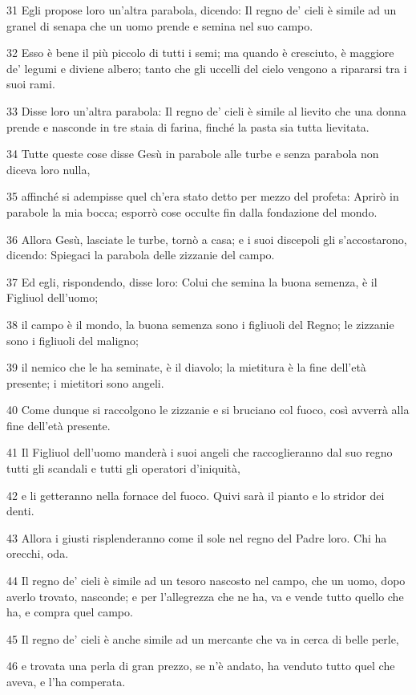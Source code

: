 \par 31 Egli propose loro un'altra parabola, dicendo: Il regno de' cieli è simile ad un granel di senapa che un uomo prende e semina nel suo campo.
\par 32 Esso è bene il più piccolo di tutti i semi; ma quando è cresciuto, è maggiore de' legumi e diviene albero; tanto che gli uccelli del cielo vengono a ripararsi tra i suoi rami.
\par 33 Disse loro un'altra parabola: Il regno de' cieli è simile al lievito che una donna prende e nasconde in tre staia di farina, finché la pasta sia tutta lievitata.
\par 34 Tutte queste cose disse Gesù in parabole alle turbe e senza parabola non diceva loro nulla,
\par 35 affinché si adempisse quel ch'era stato detto per mezzo del profeta: Aprirò in parabole la mia bocca; esporrò cose occulte fin dalla fondazione del mondo.
\par 36 Allora Gesù, lasciate le turbe, tornò a casa; e i suoi discepoli gli s'accostarono, dicendo: Spiegaci la parabola delle zizzanie del campo.
\par 37 Ed egli, rispondendo, disse loro: Colui che semina la buona semenza, è il Figliuol dell'uomo;
\par 38 il campo è il mondo, la buona semenza sono i figliuoli del Regno; le zizzanie sono i figliuoli del maligno;
\par 39 il nemico che le ha seminate, è il diavolo; la mietitura è la fine dell'età presente; i mietitori sono angeli.
\par 40 Come dunque si raccolgono le zizzanie e si bruciano col fuoco, così avverrà alla fine dell'età presente.
\par 41 Il Figliuol dell'uomo manderà i suoi angeli che raccoglieranno dal suo regno tutti gli scandali e tutti gli operatori d'iniquità,
\par 42 e li getteranno nella fornace del fuoco. Quivi sarà il pianto e lo stridor dei denti.
\par 43 Allora i giusti risplenderanno come il sole nel regno del Padre loro. Chi ha orecchi, oda.
\par 44 Il regno de' cieli è simile ad un tesoro nascosto nel campo, che un uomo, dopo averlo trovato, nasconde; e per l'allegrezza che ne ha, va e vende tutto quello che ha, e compra quel campo.
\par 45 Il regno de' cieli è anche simile ad un mercante che va in cerca di belle perle,
\par 46 e trovata una perla di gran prezzo, se n'è andato, ha venduto tutto quel che aveva, e l'ha comperata.
